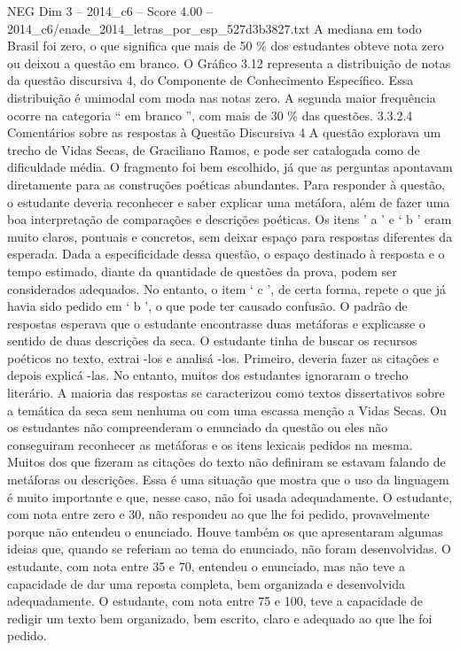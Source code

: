 \begin{textsample}{NEG Dim 3 – 2014\_c6 – Score 4.00 – 2014\_c6/enade\_2014\_letras\_por\_esp\_527d3b3827.txt}
A mediana em todo Brasil foi zero, o que significa que mais de 50 \% dos estudantes obteve nota zero ou deixou a questão em branco.
O Gráfico 3.12 representa a distribuição de notas da questão discursiva 4, do Componente de Conhecimento Específico.
Essa distribuição é unimodal com moda nas notas zero.
A segunda maior frequência ocorre na categoria “ em branco ”, com mais de 30 \% das questões. 3.3.2.4 Comentários sobre as respostas à Questão Discursiva 4 A questão explorava um trecho de Vidas Secas, de Graciliano Ramos, e pode ser catalogada como de dificuldade média.
O fragmento foi bem escolhido, já que as perguntas apontavam diretamente para as construções poéticas abundantes.
Para responder à questão, o estudante deveria reconhecer e saber explicar uma metáfora, além de fazer uma boa interpretação de comparações e descrições poéticas.
Os itens ’ a ’ e ‘ b ’ eram muito claros, pontuais e concretos, sem deixar espaço para respostas diferentes da esperada.
Dada a especificidade dessa questão, o espaço destinado à resposta e o tempo estimado, diante da quantidade de questões da prova, podem ser considerados adequados.
No entanto, o item ‘ c ’, de certa forma, repete o que já havia sido pedido em ‘ b ’, o que pode ter causado confusão.
O padrão de respostas esperava que o estudante encontrasse duas metáforas e explicasse o sentido de duas descrições da seca.
O estudante tinha de buscar os recursos poéticos no texto, extrai -los e analisá -los.
Primeiro, deveria fazer as citações e depois explicá -las.
No entanto, muitos dos estudantes ignoraram o trecho literário.
A maioria das respostas se caracterizou como textos dissertativos sobre a temática da seca sem nenhuma ou com uma escassa menção a Vidas Secas.
Ou os estudantes não compreenderam o enunciado da questão ou eles não conseguiram reconhecer as metáforas e os itens lexicais pedidos na mesma.
Muitos dos que fizeram as citações do texto não definiram se estavam falando de metáforas ou descrições.
Essa é uma situação que mostra que o uso da linguagem é muito importante e que, nesse caso, não foi usada adequadamente.
O estudante, com nota entre zero e 30, não respondeu ao que lhe foi pedido, provavelmente porque não entendeu o enunciado.
Houve também os que apresentaram algumas ideias que, quando se referiam ao tema do enunciado, não foram desenvolvidas.
O estudante, com nota entre 35 e 70, entendeu o enunciado, mas não teve a capacidade de dar uma reposta completa, bem organizada e desenvolvida adequadamente.
O estudante, com nota entre 75 e 100, teve a capacidade de redigir um texto bem organizado, bem escrito, claro e adequado ao que lhe foi pedido.

\end{textsample}
